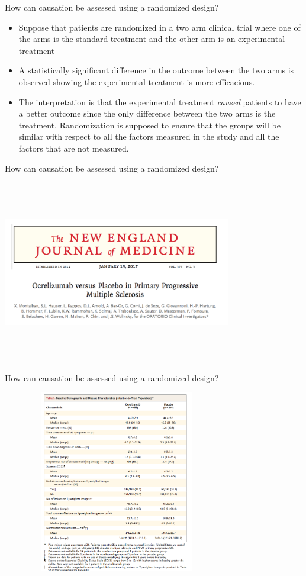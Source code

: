 \documentclass[ignorenonframetext,]{beamer}
\begin{document}
\begin{frame}{How can causation be assessed using a randomized design?}

\begin{itemize}
\item
  Suppose that patients are randomized in a two arm clinical trial where
  one of the arms is the standard treatment and the other arm is an
  experimental treatment
\item
  A statistically significant difference in the outcome between the two
  arms is observed showing the experimental treatment is more
  efficacious.
\item
  The interpretation is that the experimental treatment \emph{caused}
  patients to have a better outcome since the only difference between
  the two arms is the treatment. Randomization is supposed to ensure
  that the groups will be similar with respect to all the factors
  measured in the study and all the factors that are not measured.
\end{itemize}

\end{frame}

\begin{frame}{How can causation be assessed using a randomized design?}

\includegraphics[width=10cm, height=8cm]{nejm1.png}

\end{frame}

\begin{frame}{How can causation be assessed using a randomized design?}

\includegraphics[width=10cm, height=8cm]{nejm2.png}

\end{frame}
\end{document}
